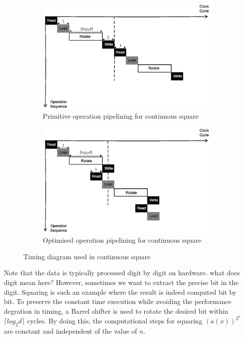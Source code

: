 \documentclass[runningheads]{llncs}
\begin{document}
\begin{figure}[!tb]
\centering
\begin{subfigure}[t]{0.45\textwidth}\centering
\includegraphics[width=\textwidth]{./fig/pipeline_square.eps}
\caption{Primitive operation pipelining for continuous square}
\label{fig:pipeline_squ}
\end{subfigure}
\hspace{1em}
\begin{subfigure}[t]{0.45\textwidth}\centering
\includegraphics[width=\textwidth]{./fig/pipeline_square2.eps}
\caption{Optimised operation pipelining for continuous square }
\label{fig:pipeline_squ2}
\end{subfigure}
\caption{Timing diagram used in continuous square}
\end{figure}

Note that the data is typically processed digit by digit on hardware. 
{\color{red} what does digit mean here?}
However, sometimes we want to extract the precise bit in the digit. 
Squaring is such an example where the result is indeed computed bit by bit. To preserve the constant time execution while 
avoiding the performance degration in timing, 
a Barrel shifter 
is used to rotate the desired bit within $\lceil log_2d\rceil$ cycles. By doing this, the computational steps for squaring $(a(x))^{2^n}$ 
are constant and independent of the value of $n$.
\end{document}
